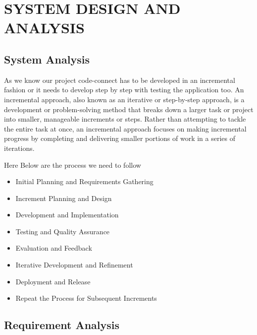 \chapter{SYSTEM DESIGN AND ANALYSIS}
\section{System Analysis}
As we know our project code-connect has to be developed in an incremental fashion or it needs to develop step by step with testing the application too. An incremental approach, also known as an iterative or step-by-step approach, is a development or problem-solving method that breaks down a larger task or project into smaller, manageable increments or steps. Rather than attempting to tackle the entire task at once, an incremental approach focuses on making incremental progress by completing and delivering smaller portions of work in a series of iterations.

Here Below are the process we need to follow
\begin{itemize}
    \setlength\itemsep{0.25em}
    \item Initial Planning and Requirements Gathering
    \item Increment Planning and Design
    \item Development and Implementation
    \item Testing and Quality Assurance
    \item Evaluation and Feedback
    \item Iterative Development and Refinement
    \item Deployment and Release
    \item Repeat the Process for Subsequent Increments
\end{itemize}
\section{Requirement Analysis}
